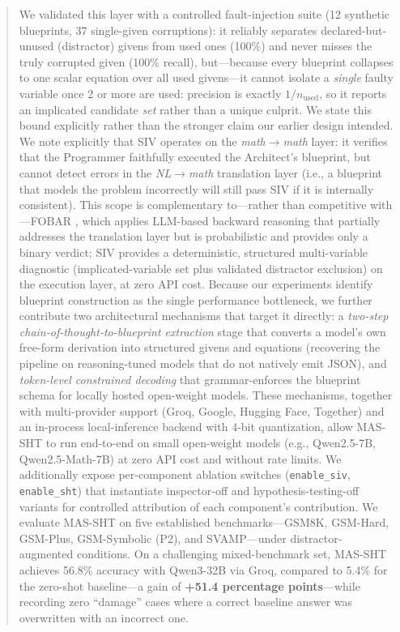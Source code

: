 \documentclass[11pt,a4paper]{article}
\begin{document}
\begin{abstract}
We validated this layer with a controlled fault-injection suite (12 synthetic blueprints, 37 single-given corruptions): it reliably separates declared-but-unused (distractor) givens from used ones (100\%) and never misses the truly corrupted given (100\% recall), but---because every blueprint collapses to one scalar equation over all used givens---it cannot isolate a \emph{single} faulty variable once 2 or more are used: precision is exactly $1/n_{\text{used}}$, so it reports an implicated candidate \emph{set} rather than a unique culprit. We state this bound explicitly rather than the stronger claim our earlier design intended.
We note explicitly that SIV operates on the \emph{math$\to$math} layer: it verifies that the Programmer faithfully executed the Architect's blueprint, but cannot detect errors in the \emph{NL$\to$math} translation layer (i.e., a blueprint that models the problem incorrectly will still pass SIV if it is internally consistent).
This scope is complementary to---rather than competitive with---FOBAR \citep{jiang2024fobar}, which applies LLM-based backward reasoning that partially addresses the translation layer but is probabilistic and provides only a binary verdict; SIV provides a deterministic, structured multi-variable diagnostic (implicated-variable set plus validated distractor exclusion) on the execution layer, at zero API cost.
Because our experiments identify blueprint construction as the single performance bottleneck, we further contribute two architectural mechanisms that target it directly: a \emph{two-step chain-of-thought-to-blueprint extraction} stage that converts a model's own free-form derivation into structured givens and equations (recovering the pipeline on reasoning-tuned models that do not natively emit JSON), and \emph{token-level constrained decoding} that grammar-enforces the blueprint schema for locally hosted open-weight models.
These mechanisms, together with multi-provider support (Groq, Google, Hugging Face, Together) and an in-process local-inference backend with 4-bit quantization, allow MAS-SHT to run end-to-end on small open-weight models (e.g., Qwen2.5-7B, Qwen2.5-Math-7B) at zero API cost and without rate limits.
We additionally expose per-component ablation switches (\texttt{enable\_siv}, \texttt{enable\_sht}) that instantiate inspector-off and hypothesis-testing-off variants for controlled attribution of each component's contribution.
We evaluate MAS-SHT on five established benchmarks---GSM8K, GSM-Hard, GSM-Plus, GSM-Symbolic (P2), and SVAMP---under distractor-augmented conditions.
On a challenging mixed-benchmark set, MAS-SHT achieves 56.8\% accuracy with Qwen3-32B via Groq, compared to 5.4\% for the zero-shot baseline---a gain of \textbf{+51.4 percentage points}---while recording zero ``damage'' cases where a correct baseline answer was overwritten with an incorrect one.

\end{abstract}
\end{document}

